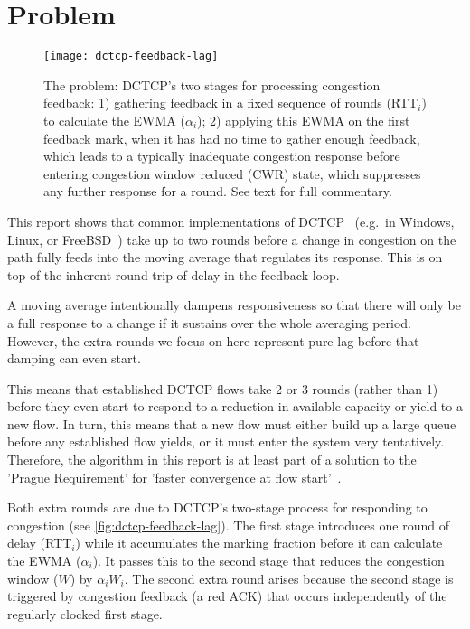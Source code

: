 \section{Problem}\label{prresp_Problem}

\begin{figure*}
	\texttt{[image: dctcp-feedback-lag]}
	\caption{The problem: DCTCP's two stages for processing congestion feedback: 1)
	gathering feedback in a fixed sequence of rounds (RTT\(_i\)) to calculate the
	EWMA (\(\alpha_i\)); 2) applying this EWMA on the first feedback mark, when it
	has had no time to gather enough feedback, which leads to a typically
	inadequate congestion response before entering congestion window reduced (CWR)
	state, which suppresses any further response for a round. See text for full
	commentary.}
	\label{fig:dctcp-feedback-lag}
\end{figure*}

This report shows that common implementations of DCTCP~\cite{Alizadeh10:DCTCP}
(e.g.\ in Windows, Linux, or FreeBSD~\cite{Bensley17:DCTCP}) take up to two
rounds before a change in congestion on the path fully feeds into the moving
average that regulates its response. This is on top of the inherent round trip
of delay in the feedback loop.

A moving average intentionally dampens responsiveness so that there will only be
a full response to a change if it sustains over the whole averaging period.
However, the extra rounds we focus on here represent pure lag before that
damping can even start.

This means that established DCTCP flows take 2 or 3 rounds (rather than 1)
before they even start to respond to a reduction in available capacity or yield
to a new flow. In turn, this means that a new flow must either build up a large
queue before any established flow yields, or it must enter the system very
tentatively. Therefore, the algorithm in this report is at least part of a
solution to the 'Prague Requirement' for 'faster convergence at flow
start'~\cite[Appx A.2.3]{Briscoe15f:ecn-l4s-id_ID}.

Both extra rounds are due to DCTCP's two-stage process for responding to
congestion (see \autoref{fig:dctcp-feedback-lag}). The first stage introduces
one round of delay (RTT\(_i\)) while it accumulates the marking fraction before
it can calculate the EWMA (\(\alpha_i\)). It passes this to the second stage
that reduces the congestion window (\(W\)) by \(\alpha_i W_i\). The second extra
round arises because the second stage is triggered by congestion feedback (a red
ACK) that occurs independently of the regularly clocked first stage.

